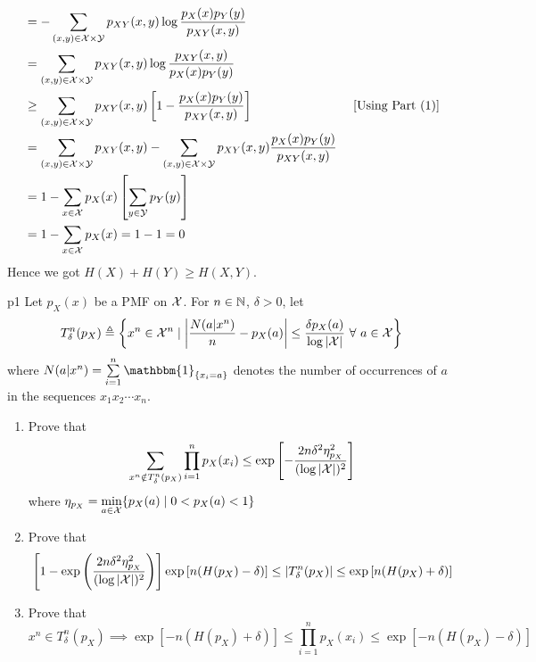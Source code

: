 \documentclass[a4paper, 11pt]{article}
\begin{document}
{\begin{enumerate}
\begin{align*}
		                 & = -\sum_{(x,y)\in \mathcal{X}\times \mathcal{Y}}p_{XY}(x,y)\log \frac{p_X(x)p_Y(y)}{p_{XY}(x,y)}                                                                 \\
		                 & = \sum_{(x,y)\in \mathcal{X}\times \mathcal{Y}}p_{XY}(x,y)\log \frac{p_{XY}(x,y)}{p_X(x)p_Y(y)}                                                                  \\
		                 & \geq \sum_{(x,y)\in \mathcal{X}\times \mathcal{Y}}p_{XY}(x,y)\left[ 1-\frac{p_X(x)p_Y(y)}{p_{XY}(x,y)} \right] \qquad\qquad\qquad\qquad \left[\text{Using Part (1)}\right] \\
		                 & = \sum_{(x,y)\in \mathcal{X}\times \mathcal{Y}}p_{XY}(x,y) - \sum_{(x,y)\in \mathcal{X}\times \mathcal{Y}}p_{XY}(x,y)\frac{p_X(x)p_Y(y)}{p_{XY}(x,y)}                          \\
		                 & = 1-\sum_{x\in \mathcal{X}}p_X(x)\left[  \sum_{y\in \mathcal{Y}}p_Y(y)\right]                                                                                         \\
		                 & = 1-\sum_{x\in \mathcal{X}}p_X(x)=1-1=0
	\end{align*}
	Hence we got $H(X)+H(Y)\geq H(X,Y)$.
		\end{enumerate}
	}

\pagebreak
	
	
	\begin{problem}{%
	}{p1%
	}
	Let $p_X(x)$ be a PMF on $\mathcal{X}$. For $n\in \mathbb{N}$, $\delta>0$, let $$T_{\delta}^n(p_X)\triangleq \left\{ x^n\in \mathcal{X}^n\mid  \left| \frac{N(a|x^n)}{n}-p_X(a) \right| \leq \frac{\delta p_X(a)}{\log |\mathcal{X}|}\ \forall \ a\in \mathcal{X} \right\}$$ where $N(a|x^n)=\sum\limits_{i=1}^n\mathbbm{1}_{\{x_i=a\}}$ denotes the number of occurrences of $a$ in the sequences $x_1x_2\cdots x_n$.
	\begin{enumerate}
		\item Prove that $$\sum_{x^n\notin T_{\delta}^n(p_X)} \prod_{i=1}^n p_X(x_i)\leq \exp \left[ -\frac{2n\delta^2\eta^2_{p_X}}{(\log |\mathcal{X}|)^2} \right]$$ where $\eta_{p_X}=\min\limits_{a\in \mathcal{X}}\{p_X(a)\mid 0<p_X(a)<1\}$
		\item Prove that $$\left[1-   \exp \left( \frac{2n\delta^2\eta^2_{p_X}}{(\log |\mathcal{X}|)^2}  \right) \right] \exp\left[  n(H(p_X)-\delta)\right]\leq |T_{\delta}^n(p_X)|\leq \exp\left[n(H(p_X)+\delta)\right] $$
		\item Prove that $$x^n\in T_{\delta}^n(p_X)\implies \exp[-n(H(p_X)+\delta)]\leq \prod_{i=1}^np_X(x_i)\leq \exp[-n(H(p_X)-\delta)]$$
	\end{enumerate}
\end{problem}
\end{document}
